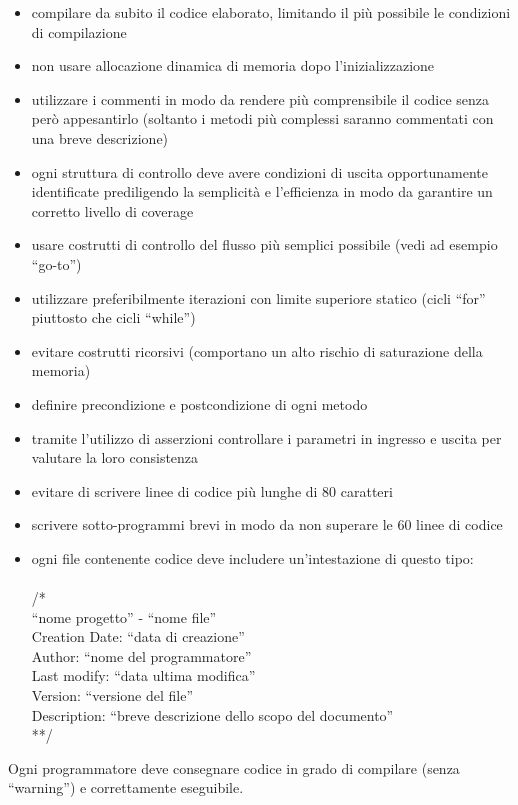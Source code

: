 \documentclass[a4paper,11pt]{article}
\begin{document}
\begin{itemize}
\item compilare da subito il codice elaborato, limitando il pi\`u possibile le condizioni di compilazione
\item non usare allocazione dinamica di memoria dopo l'inizializzazione
\item utilizzare i commenti in modo da rendere pi\`u comprensibile il codice senza per\`o appesantirlo (soltanto i metodi pi\`u complessi saranno commentati con una breve descrizione)
\item ogni struttura di controllo deve avere condizioni di uscita opportunamente identificate prediligendo la semplicit\`a e l'efficienza in modo da garantire un corretto livello di coverage
\item usare costrutti di controllo del flusso pi\`u semplici possibile (vedi ad esempio ``go-to'')
\item utilizzare preferibilmente iterazioni con limite superiore statico (cicli ``for'' piuttosto che cicli ``while'')
\item evitare costrutti ricorsivi (comportano un alto rischio di saturazione della memoria)
\item definire precondizione e postcondizione  di ogni metodo
\item tramite l'utilizzo di asserzioni controllare i parametri in ingresso e uscita per valutare la loro consistenza
\item evitare di scrivere linee di codice pi\`u lunghe di 80 caratteri
\item scrivere sotto-programmi brevi in modo da non superare le 60 linee di codice
\item ogni file contenente codice deve includere un'intestazione di questo tipo:\\
\\/*
\\``nome progetto'' - ``nome file''
\\Creation Date: ``data di creazione''
\\Author: ``nome del programmatore''
\\Last modify: ``data ultima modifica''
\\Version: ``versione del file''
\\Description: ``breve descrizione dello scopo del documento''
\\**/
\end{itemize}
Ogni programmatore deve consegnare codice in grado di compilare (senza ``warning'') e correttamente eseguibile.
\end{document}
